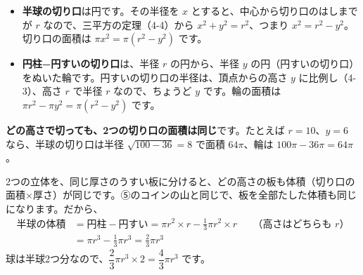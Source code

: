 \begin{itemize}[leftmargin=1.2\zw, itemsep=2pt, topsep=2pt, label={\color{\bkTT}●}]
\item \textbf{半球の切り口}は円です。その半径を $x$ とすると、中心から切り口のはしまでが $r$ なので、三平方の定理（4-4）から $x^2+y^2=r^2$、つまり $x^2=r^2-y^2$。切り口の面積は $\pi x^2=\pi(r^2-y^2)$ です。
\item \textbf{円柱−円すいの切り口}は、半径 $r$ の円から、半径 $y$ の円（円すいの切り口）をぬいた輪です。円すいの切り口の半径は、頂点からの高さ $y$ に比例し（4-3）、高さ $r$ で半径 $r$ なので、ちょうど $y$ です。輪の面積は $\pi r^2-\pi y^2=\pi(r^2-y^2)$ です。
\end{itemize}
\textbf{どの高さで切っても、2つの切り口の面積は同じ}です。たとえば $r=10$、$y=6$ なら、半球の切り口は半径 $\sqrt{100-36}=8$ で面積 $64\pi$、輪は $100\pi-36\pi=64\pi$。

2つの立体を、同じ厚さのうすい板に分けると、どの高さの板も体積（切り口の面積×厚さ）が同じです。⑤のコインの山と同じで、板を全部たした体積も同じになります。だから、
\begin{align*}
\text{半球の体積}&=\text{円柱}-\text{円すい}=\pi r^2\times r-\frac{1}{3}\pi r^2\times r&&\text{（高さはどちらも $r$）}\\
&=\pi r^3-\frac{1}{3}\pi r^3=\frac{2}{3}\pi r^3
\end{align*}
球は半球2つ分なので、$\dfrac{2}{3}\pi r^3\times2=\dfrac{4}{3}\pi r^3$ です。

